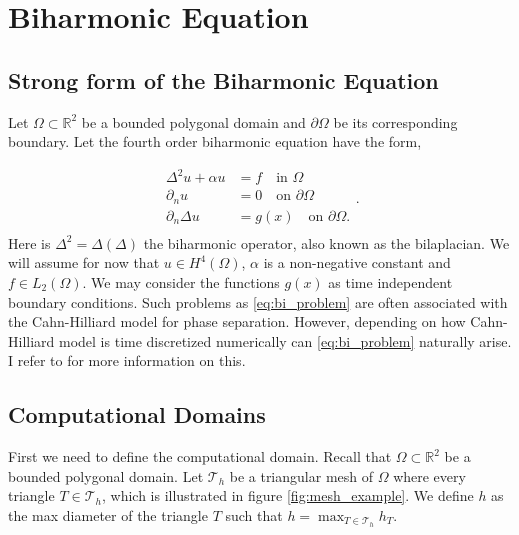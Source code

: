 \newpage
\section{ Biharmonic Equation}
\label{sec:ch1}


\subsection{Strong form of the Biharmonic Equation}%
\label{sub:strong_form_of_the_biharmonic_equation}


Let $\Omega \subset   \mathbb{R} ^2$ be a bounded polygonal domain and $\partial \Omega $ be its corresponding boundary. Let the fourth order biharmonic equation have the form,

\begin{equation}
\label{eq:bi_problem}
\begin{split}
    \Delta^2  u  + \alpha  u  & = f \quad \text{in } \Omega   \\
    \partial _{n} u & = 0  \quad \text{on } \partial \Omega  \\
    \partial _{n} \Delta  u & = g\left( x \right)  \quad \text{on } \partial \Omega .  \\
\end{split}
.\end{equation}
Here is $\Delta ^2 = \Delta  \left( \Delta  \right) $ the biharmonic operator, also known as the bilaplacian. We will assume for now that $u \in H^{4}\left( \Omega  \right) $, $\alpha $ is a non-negative constant and $f \in L_{2}\left( \Omega  \right)
$. We may consider the functions $g\left( x \right) $ as time independent boundary conditions. Such problems as \eqref{eq:bi_problem} are often associated with the Cahn-Hilliard model
\cite{cahnhilliard1957} for phase separation. However, depending on how Cahn-Hilliard model is time discretized numerically can
\eqref{eq:bi_problem} naturally arise. I refer to \cite{brenner2012quadratic} for more information on this.

\subsection{Computational Domains}%
\label{sub:computational_domain}

First we need to define the computational domain. Recall that $\Omega \subset   \mathbb{R} ^2$ be a bounded polygonal domain. Let $\mathcal{T} _{h}$ be a triangular mesh of $\Omega$ where every triangle $T \in  \mathcal{T} _{h}$, which is illustrated
in figure \ref{fig:mesh_example}. We define $h$ as
the max diameter of the triangle $T$ such that $h = \max_{T \in \mathcal{T}_{h} }  h_T  $.

